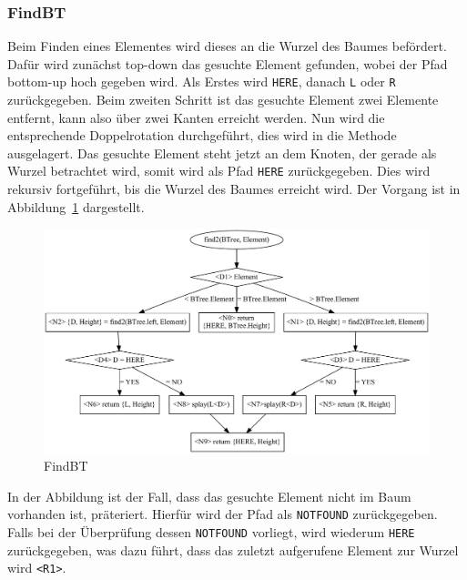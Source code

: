 \subsubsection{FindBT}\label{par:splay-findBT}
Beim Finden eines Elementes wird dieses an die Wurzel des Baumes befördert.
Dafür wird zunächst top-down das gesuchte Element gefunden, wobei der Pfad
bottom-up hoch gegeben wird.
Als Erstes wird \verb|HERE|, danach \verb|L| oder \verb|R| zurückgegeben.
Beim zweiten Schritt ist das gesuchte Element zwei Elemente entfernt, kann also über zwei
Kanten erreicht werden.
Nun wird die entsprechende Doppelrotation durchgeführt, dies wird in die 
Methode ausgelagert.
Das gesuchte Element steht jetzt an dem Knoten, der gerade als Wurzel betrachtet wird, somit wird
als Pfad \verb|HERE| zurückgegeben.
Dies wird rekursiv fortgeführt, bis die Wurzel des Baumes erreicht wird.
Der Vorgang ist in Abbildung~\ref{fig:splayFind} dargestellt.
\begin{figure}[hbt]
    \centering
    \includegraphics[scale = 0.35]{img/gv/splayFind2}
    \caption{FindBT}
    \label{fig:splayFind}
\end{figure}

In der Abbildung ist der Fall, dass das gesuchte Element nicht im Baum vorhanden ist, präteriert.
Hierfür wird der Pfad als \verb|NOTFOUND| zurückgegeben.
Falls bei der Überprüfung dessen \verb|NOTFOUND| vorliegt, wird wiederum \verb|HERE|
zurückgegeben, was dazu führt, dass das zuletzt aufgerufene Element zur Wurzel wird \verb|<R1>|.

